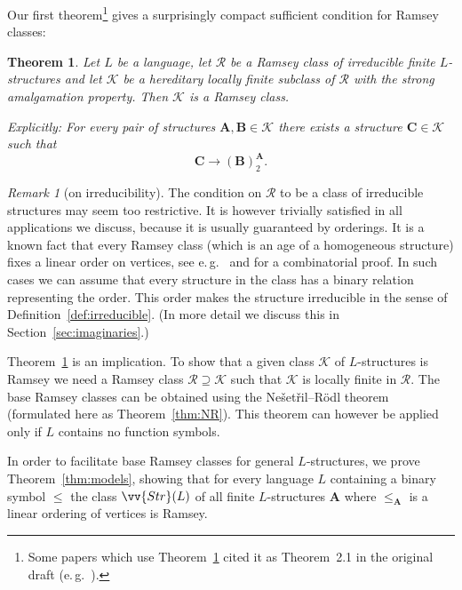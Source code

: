 \documentclass{elsarticle}
\newcommand{\eg}{e.\,g.}
\def\ordclass#1{\vv{#1}}
\def\str#1{\mathbf {#1}}
\def\K{{\mathcal K}}
\theoremstyle{plain}
\newtheorem{theorem}{Theorem}[section]
\theoremstyle{definition}
\theoremstyle{remark}
\newtheorem*{remark}{Remark}
\begin{document}
Our first theorem\footnote{Some papers which use Theorem~\ref{thm:mainstrong} cited it as Theorem~2.1 in the original draft (\eg~\cite{Evans2}).} gives a surprisingly compact sufficient condition
for Ramsey classes:

\begin{theorem}
\label{thm:mainstrong}
Let $L$ be a language, let $\mathcal R$ be a Ramsey class of irreducible finite $L$-structures and let $\K$ be a hereditary
locally finite subclass of $\mathcal R$ with the strong amalgamation property.
Then $\K$ is a Ramsey class.

Explicitly:
For every pair of struc\-tures $\str{A}, \str{B}\in\K$ there exists
a structure $\str{C} \in \K$  such that
$$
\str{C} \longrightarrow (\str{B})^{\str{A}}_2.
$$
\end{theorem}

\begin{remark}[on irreducibility]
The condition on $\mathcal R$ to be a class of irreducible structures may seem
too restrictive. It is however trivially satisfied in all applications we discuss, because it is usually guaranteed by orderings.  It is a
known fact that every Ramsey class (which is an age of a homogeneous structure) fixes a linear order on
vertices, see \eg{}\ \cite{Kechris2005} and \cite{Bodirsky2015} for a combinatorial proof. In such cases 
we can assume that
every structure in the class has a binary relation representing the
order. This order makes the structure irreducible in the sense of
Definition~\ref{def:irreducible}. (In more detail we discuss this in Section~\ref{sec:imaginaries}.)
\end{remark}

Theorem~\ref{thm:mainstrong} is an implication. To show that
a given class $\mathcal K$ of $L$-structures is Ramsey we need a Ramsey class $\mathcal R\supseteq \mathcal K$ such that $\mathcal K$ is locally finite in $\mathcal R$.
The base Ramsey classes can be obtained 
using the Ne\v set\v ril--R\"odl theorem (formulated here as Theorem~\ref{thm:NR}). This theorem can however be applied only if $L$ contains no function symbols.

In order to facilitate base Ramsey classes for general $L$-structures, we prove Theorem~\ref{thm:models}, showing that for every language $L$ containing a binary symbol $\leq$ the class $\ordclass{Str}(L)$
of all finite $L$-structures $\str{A}$ where $\leq_\str{A}$ is a linear ordering of vertices is Ramsey.
\end{document}
